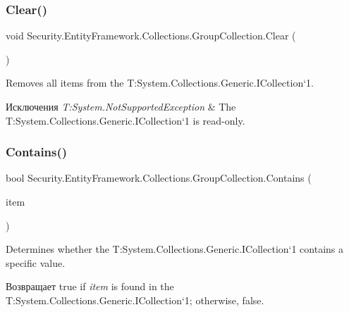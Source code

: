 \subsubsection{\texorpdfstring{Clear()}{Clear()}}
{\footnotesize\ttfamily void Security.\+Entity\+Framework.\+Collections.\+Group\+Collection.\+Clear (\begin{DoxyParamCaption}{ }\end{DoxyParamCaption})}



Removes all items from the T\+:\+System.\+Collections.\+Generic.\+I\+Collection`1. 


\begin{DoxyExceptions}{Исключения}
{\em T\+:\+System.\+Not\+Supported\+Exception} & The T\+:\+System.\+Collections.\+Generic.\+I\+Collection`1 is read-\/only. \\
\hline
\end{DoxyExceptions}
\mbox{\label{class_security_1_1_entity_framework_1_1_collections_1_1_group_collection_a13e181f27c4d6863d198026ecf4f047f}} 
\subsubsection{\texorpdfstring{Contains()}{Contains()}}
{\footnotesize\ttfamily bool Security.\+Entity\+Framework.\+Collections.\+Group\+Collection.\+Contains (\begin{DoxyParamCaption}\item[{\hyperlink{interface_security_1_1_interfaces_1_1_model_1_1_i_group}{I\+Group}}]{item }\end{DoxyParamCaption})}



Determines whether the T\+:\+System.\+Collections.\+Generic.\+I\+Collection`1 contains a specific value. 

\begin{DoxyReturn}{Возвращает}
true if {\itshape item}  is found in the T\+:\+System.\+Collections.\+Generic.\+I\+Collection`1; otherwise, false. 
\end{DoxyReturn}

